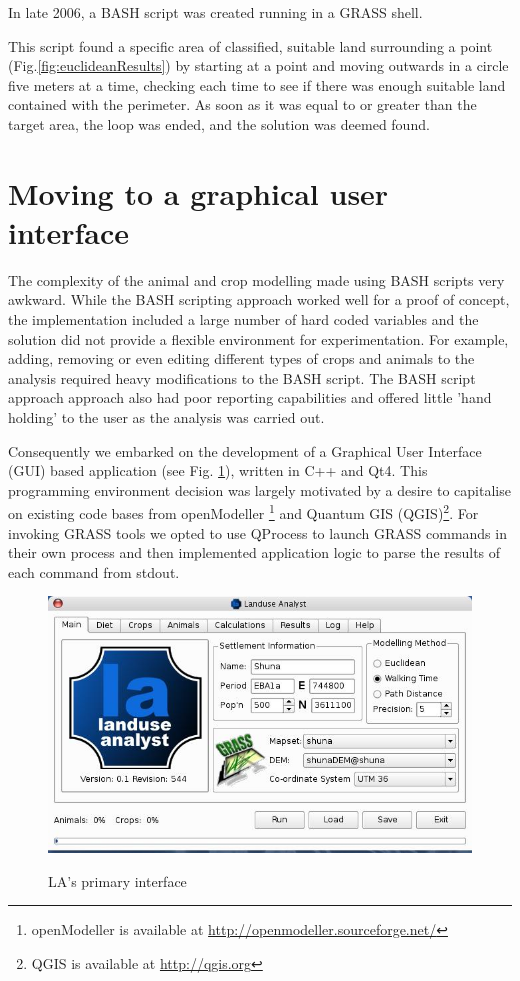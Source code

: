 In late 2006, a BASH script was created running in a GRASS shell.

This script found a specific area of classified, suitable land surrounding a
point (Fig.\ref{fig:euclideanResults})  by starting at a point and moving
outwards in a circle five meters at a time, checking each time to see if there
was enough suitable land contained with the perimeter.  As soon as it was equal
to or greater than the target area, the loop was ended, and the solution was
deemed found.

\section{Moving to a graphical user interface} \label{GUI} 
 
The complexity of the animal and crop modelling made using BASH scripts very
awkward.  While the BASH scripting approach worked well for a proof of concept,
the implementation included a large number of hard coded variables and the
solution 
did not provide a flexible environment for experimentation. For example, adding,
removing or even 
editing different types of crops and animals to the analysis required heavy
modifications 
to the BASH script.  The BASH script approach approach also had poor reporting
capabilities and offered little 'hand holding' to the user as the analysis was 
carried out.

Consequently we embarked on the development of a Graphical User Interface (GUI)
based 
application (see Fig. \ref{fig:la544}), written in C++ and Qt4. This programming
environment decision was largely 
motivated by a desire to capitalise on existing code bases from openModeller
\footnote{openModeller is available at
\url{http://openmodeller.sourceforge.net/}} 
and Quantum GIS (QGIS)\footnote{QGIS is available at \url{http://qgis.org}}.  
For invoking GRASS tools we opted to use QProcess to launch GRASS commands in 
their own process and then implemented application logic to parse the results
of 
each command from stdout.

\begin{figure}[htbp] %
  \includegraphics[scale=0.36]{./images/LanduseAnalyst544.jpg}
   \label{fig:la544} \caption{LA's primary interface}
   \end{figure}


